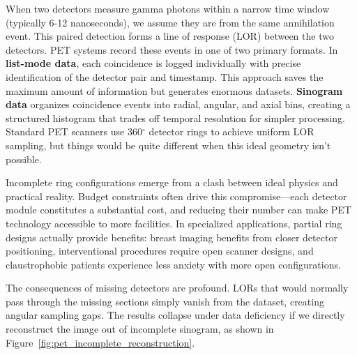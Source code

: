 \documentclass[12pt]{iopart}
\begin{document}
When two detectors measure gamma photons within a narrow time window (typically 6-12 nanoseconds), we assume they are from the same annihilation event. This paired detection forms a line of response (LOR) between the two detectors.
PET systems record these events in one of two primary formats. In \textbf{list-mode data}, each coincidence is logged individually with precise identification of the detector pair and timestamp. This approach saves the maximum amount of information but generates enormous datasets. \textbf{Sinogram data} organizes coincidence events into radial, angular, and axial bins, creating a structured histogram that trades off temporal resolution for simpler processing. Standard PET scanners use 360$^\circ$ detector rings to achieve uniform LOR sampling, but things would be quite different when this ideal geometry isn't possible.






Incomplete ring configurations emerge from a clash between ideal physics and practical reality. Budget constraints often drive this compromise—each detector module constitutes a substantial cost, and reducing their number can make PET technology accessible to more facilities. In specialized applications, partial ring designs actually provide benefits: breast imaging benefits from closer detector positioning, interventional procedures require open scanner designs, and claustrophobic patients experience less anxiety with more open configurations.





The consequences of missing detectors are profound. 
LORs that would normally pass through the missing sections simply vanish from the dataset, creating angular sampling gaps. The results collapse under data deficiency if we directly reconstruct the image out of incomplete sinogram, as shown in Figure~\ref{fig:pet_incomplete_reconstruction}.
\end{document}
